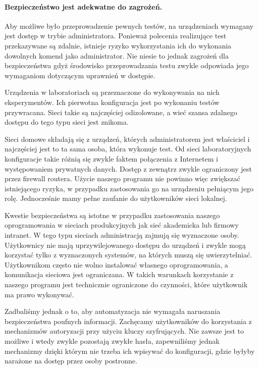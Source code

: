 \documentclass[00-praca-magisterska.tex]{subfiles}
\begin{document}
\paragraph{Bezpieczeństwo jest adekwatne do zagrożeń.} Aby możliwe było
przeprowadzenie pewnych testów, na urządzeniach wymagany jest dostęp w trybie
administratora. Ponieważ polecenia realizujące test przekazywane są zdalnie,
istnieje ryzyko wykorzystania ich do wykonania dowolnych komend jako
administrator. Nie niesie to jednak zagrożeń dla bezpieczeństwa gdyż środowisko
przeprowadzania testu zwykle odpowiada jego wymaganiom dotyczącym uprawnień w
dostępie.

Urządzenia w laboratoriach są przeznaczone do wykonywania na nich
eksperymentów.  Ich pierwotna konfiguracja jest po wykonaniu testów
przywracana. Sieci takie są najczęściej odizolowane, a wieć szansa zdalnego
dostępu do tego typu sieci jest znikoma.

Sieci domowe składają się z urządzeń, których administratorem jest właściciel i
najczęściej jest to ta sama osoba, która wykonuje test. Od sieci laboratoryjnych
konfiguracje takie różnią się zwykle faktem połączenia z Internetem i
występowaniem prywatnych danych. Dostęp z zewnątrz zwykle ograniczony jest przez
firewall routera. Użycie naszego programu nie powinno więc zwiększać
istniejącego ryzyka, w przypadku zastosowania go na urządzeniu pełniącym jego
rolę. Jednocześnie mamy pełne zaufanie do użytkowników sieci lokalnej.

Kwestie bezpieczeństwa są istotne w przypadku zastosowania naszego
oprogramowania w sieciach produkcyjnych jak sieć akademicka lub firmowy
intranet. W tego typu sieciach administracją zajmują się wyznaczone osoby.
Użytkownicy nie mają uprzywilejowanego dostępu do urządzeń i zwykle mogą
korzystać tylko z wyznaczonych systemów, na których muszą się uwierzytelniać.
Użytkownikom często nie wolno instalować własnego oprogramowania, a komunikacja
sieciowa jest ograniczana. W takich warunkach korzystanie z naszego programu
jest technicznie ograniczone do czynności, które użytkownik ma prawo wykonywać. 

Zadbaliśmy jednak o to, aby automatyzacja nie wymagała naruszania
bezpieczeństwa poufnych informacji. Zachęcamy użytkowników do korzystania z
mechanizmów autoryzacji przy użyciu kluczy szyfrujących. Nie zawsze jest to
możliwe i wtedy zwykle pozostają zwykłe hasła, zapewniliśmy jednak mechanizmy
dzięki którym nie trzeba ich wpisywać do konfiguracji, gdzie byłyby narażone na
dostęp przez osoby postronne.
\end{document}
